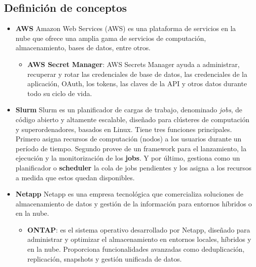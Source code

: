 \subsection{Definición de conceptos}
\begin{itemize}
    \item \textbf{AWS} \newline
    Amazon Web Services (AWS) es una plataforma de servicios en la nube que ofrece una amplia gama de servicios de computación, almacenamiento, bases de datos, entre otros.\cite{QueEsAWS}
    \begin{itemize}
        \item \textbf{AWS Secret Manager}: AWS Secrets Manager ayuda a administrar, recuperar y rotar las credenciales de base de datos, 
        las credenciales de la aplicación, OAuth, los tokens, las claves de la API y otros datos durante todo su ciclo de vida.
    \end{itemize}
   
    \item \textbf{Slurm} \newline
    Slurm es un planificador de cargas de trabajo, denominado \textit{jobs}, de código abierto y altamente escalable, diseñado para 
    clústeres de computación y superordenadores, basados en Linux. Tiene tres funciones principales. Primero asigna recursos 
    de computación (nodos) a los usuarios durante un período de tiempo. Segundo provee de un framework para el lanzamiento, 
    la ejecución y la monitorización de los \textbf{jobs}. Y por último, gestiona como un planificador o \textbf{scheduler} la cola de jobs 
    pendientes y los asigna a los recursos a medida que estos quedan disponibles.\cite{SlurmWorkloadManager}
    
    \item \textbf{Netapp} \newline
    Netapp es una empresa tecnológica que comercializa soluciones de almacenamiento de datos y gestión de la información para entornos híbridos o en la nube. \cite{LiderAlmacenamientoDatos}

    \begin{itemize}
        \item \textbf{ONTAP}: es el sistema operativo desarrollado por Netapp, diseñado para administrar y optimizar el almacenamiento 
        en entornos locales, híbridos y en la nube. Proporciona funcionalidades avanzadas como deduplicación, replicación, snapshots y gestión unificada de datos. 
    \end{itemize}
    

\end{itemize}
